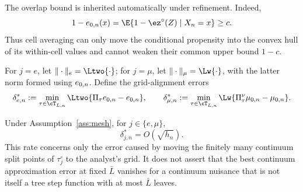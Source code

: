 The overlap bound is inherited automatically under refinement.  Indeed,
\[
  1-\ezn(x)
  =\E\{1-\ez^\circ(Z)\mid X_n=x\}
  \ge c.
\]
Thus cell averaging can only move the conditional propensity into the convex
hull of its within-cell values and cannot weaken their common upper bound
$1-c$.

For $j=e$, let $\|\cdot\|_e=\Ltwo{\cdot}$; for $j=\mu$, let
$\|\cdot\|_\mu=\Lw{\cdot}$, with the latter norm formed using $e_{0,n}$.  Define
the grid-alignment errors
\begin{equation}\label{eq:mesh-delta}
  \delta^*_{e,n}
  :=\min_{\tau\in\cT_{\bar L,n}}
       \Ltwo{\Pi_\tau\ezn-\ezn},
  \qquad
  \delta^*_{\mu,n}
  :=\min_{\tau\in\cT_{\bar L,n}}
       \Lw{\Pi^\nu_\tau\mzn-\mzn}.
\end{equation}

\begin{lemma}\label{lem:mesh-approx}
Under Assumption~\ref{ass:mesh}, for $j\in\{e,\mu\}$,
\[
  \delta^*_{j,n}=O(\sqrt{h_n}).
\]
This rate concerns only the error caused by moving the finitely many continuum
split points of $\tau_j^\circ$ to the analyst's grid.  It does not assert that
the best continuum approximation error at fixed $\bar L$ vanishes for a
continuum nuisance that is not itself a tree step function with at most
$\bar L$ leaves.
\end{lemma}

